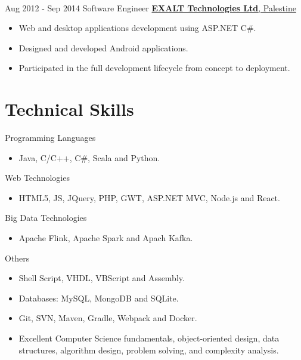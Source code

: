 \documentclass[letterpaper]{twentysecondcv} %
\begin{document}
\begin{twenty}
{{\begin{itemize}
        
    \end{itemize}}
        }
     \\
     \twentyitem
   		{Aug 2012 -}
		{Sep 2014}
        {Software Engineer}
        {\href{http://www.exalt-tech.com/about/}{\large\textbf{EXALT Technologies Ltd}, Palestine}}
        {}
        {
        \begin{itemize}
        \item Web and desktop applications development using ASP.NET C\#.
        \item Designed and developed Android applications. 
        \item Participated in the full development lifecycle from concept to deployment.
        
    \end{itemize}
    	}
        
\end{twenty}

\section{Technical  Skills}
\begin{twenty} %
	\twentyitem
	{}
	{}
	{Programming Languages}
	{}
	{}
	{ \begin{itemize}
			\item Java, C/C++, C\#, Scala and  Python.	\\	
	\end{itemize}}

	\twentyitem
{}
{}
{Web Technologies}
{}
{}
{ \begin{itemize}
		\item HTML5, JS, JQuery, PHP,  GWT, ASP.NET MVC, Node.js and React.	\\	
\end{itemize}}

		\twentyitem
	{}
	{}
	{Big Data Technologies}
	{}
	{}
	{ \begin{itemize}
			\item Apache Flink,  Apache
			Spark and Apach Kafka.	\\	
	\end{itemize}}

		\twentyitem
{}
{}
{Others}
{}
{}
{ \begin{itemize}
		\item Shell Script, VHDL, VBScript and Assembly.	
		\item Databases: MySQL, MongoDB and SQLite.
		\item Git, SVN, Maven, Gradle, Webpack and Docker.
		\item Excellent Computer Science fundamentals, object-oriented design, data structures, algorithm design, problem solving, and complexity analysis.	
\end{itemize}}



\end{twenty}
\end{document}
